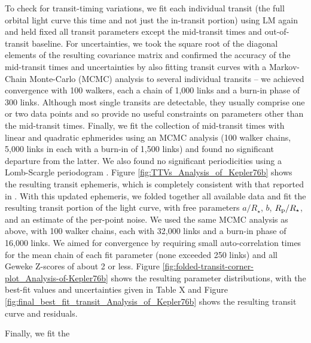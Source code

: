 \documentclass[manuscript]{aastex62}
\begin{document}
To check for transit-timing variations, we fit each individual transit (the full orbital light curve this time and not just the in-transit portion) using LM again and held fixed all transit parameters except the mid-transit times and out-of-transit baseline. For uncertainties, we took the square root of the diagonal elements of the resulting covariance matrix \citep[p.~790]{Press:2007:NRE:1403886} and confirmed the accuracy of the mid-transit times and uncertainties by also fitting transit curves with a Markov-Chain Monte-Carlo (MCMC) analysis \citep{2013PASP..125..306F} to several individual transits -- we achieved convergence with 100 walkers, each a chain of 1,000 links and a burn-in phase of 300 links. Although most single transits are detectable, they usually comprise one or two data points and so provide no useful constraints on parameters other than the mid-transit times. Finally, we fit the collection of mid-transit times with linear and quadratic ephmerides using an MCMC analysis (100 walker chains, 5,000 links in each with a burn-in of 1,500 links) and found no significant departure from the latter. We also found no significant periodicities using a Lomb-Scargle periodogram \citep{1976Ap&SS..39..447L, 1982ApJ...263..835S}. Figure \ref{fig:TTVs_Analysis_of_Kepler76b} shows the resulting transit ephemeris, which is completely consistent with that reported in \citet{2013ApJ...771...26F}. With this updated ephemeris, we folded together all available data and fit the resulting transit portion of the light curve, with free parameters $a/R_\star$, $b$, $R_{\rm p}/R_\star$, and an estimate of the per-point noise. We used the same MCMC analysis as above, with 100 walker chains, each with 32,000 links and a burn-in phase of 16,000 links. We aimed for convergence by requiring small auto-correlation times \citep[e.g][]{geyer1992} for the mean chain of each fit parameter (none exceeded 250 links) and all Geweke Z-scores \citep{Geweke92evaluatingthe} of about 2 or less. Figure \ref{fig:folded-transit-corner-plot_Analysis-of-Kepler76b} shows the resulting parameter distributions, with the best-fit values and uncertainties given in Table X and Figure \ref{fig:final_best_fit_transit_Analysis_of_Kepler76b} shows the resulting transit curve and residuals.

Finally, we fit the 
\end{document}
